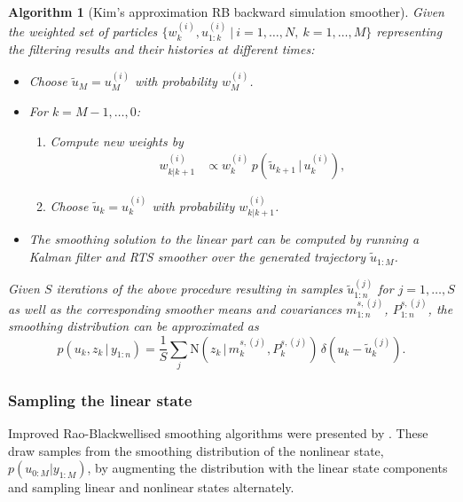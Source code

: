 \documentclass[twocolumn]{autart}    %
\newtheorem{algo}{Algorithm}[section]
\begin{document}
\begin{algo}[Kim's approximation RB backward simulation smoother]
  \label{alg:rbbssmooth}
  Given the weighted set of particles $\{ w_k^{(i)}, u_{1:k}^{(i)} ~|~
  i=1,\ldots,N,~k=1,\ldots,M \}$ representing the filtering results
  and their histories at different times:
\begin{itemize}
\item Choose $\tilde{u}_M = u_M^{(i)}$ with probability $w^{(i)}_{M}$.
\item For $k=M-1,\ldots,0$:
\begin{enumerate}
  \item Compute new weights by
    \begin{equation}
      \begin{split}
        w^{(i)}_{k|k+1} &\propto
        w_k^{(i)} \,
        p(\tilde{u}_{k+1}\,|\,u_{k}^{(i)}),
     \end{split}
    \end{equation}

  \item Choose $\tilde{u}_k = u_k^{(i)}$ with probability
    $w^{(i)}_{k|k+1}$.
  \end{enumerate}
\item The smoothing solution to the linear part can be computed by running a Kalman filter and RTS smoother over the generated trajectory $\tilde{u}_{1:M}$.
\end{itemize}
%
Given $S$ iterations of the above procedure resulting in samples $\tilde{u}_{1:n}^{(j)}$ for $j=1,\ldots,S$ as well as the corresponding smoother means and covariances $m^{s,(j)}_{1:n}$, $P^{s,(j)}_{1:n}$, the smoothing distribution can be approximated as
%
\begin{equation}
  p(u_k,z_k\,|\,y_{1:n})
  = \frac{1}{S} \sum_j \mathrm{N}(z_k\,|\,m_k^{s,(j)},P_k^{s,(j)}) \,
  \delta(u_k - \tilde{u}_k^{(j)}).
\nonumber
\end{equation}
\end{algo}




\subsubsection{Sampling the linear state}
%
Improved Rao-Blackwellised smoothing algorithms were presented by \cite{Fong+Godsill+Doucet+West:2002,Lindsten+Schon:2011}. These draw samples from the smoothing distribution of the nonlinear state, $p(u_{0:M} | y_{1:M})$, by augmenting the distribution with the linear state components and sampling linear and nonlinear states alternately.
\end{document}
